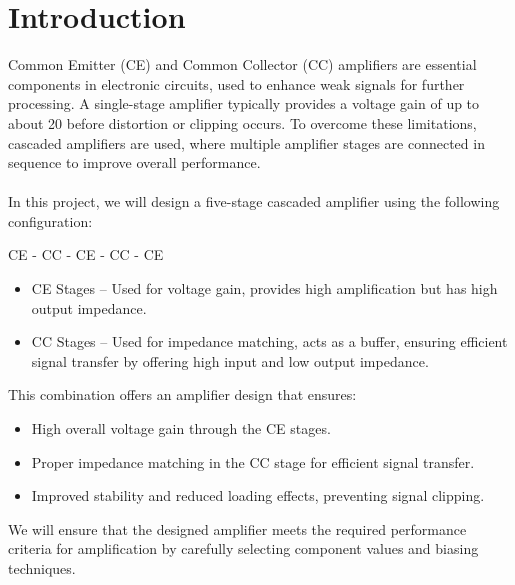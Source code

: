 \documentclass[12pt, a4paper]{article}
\begin{document}
    \section{Introduction}
    Common Emitter (CE) and Common Collector (CC) amplifiers are essential components in electronic circuits, used to enhance weak signals for further processing. 
    A single-stage amplifier typically provides a voltage gain of up to about 20 before distortion or clipping occurs.
    To overcome these limitations, cascaded amplifiers are used, where multiple amplifier stages are connected in sequence to improve overall performance.
    \\
    \\In this project, we will design a five-stage cascaded amplifier using the following \\configuration:
    \begin{center}
        CE - CC - CE - CC - CE 
    \end{center}
\begin{itemize}
\item CE Stages – Used for voltage gain, provides high amplification but has high output impedance.
\item CC Stages – Used for impedance matching, acts as a buffer, ensuring efficient signal transfer by offering high input and low output impedance.
\end{itemize}
This combination offers an amplifier design that ensures:
\begin{itemize}
\item High overall voltage gain through the CE stages.
\item Proper impedance matching in the CC stage for efficient signal transfer.
\item Improved stability and reduced loading effects, preventing signal clipping.
\end{itemize}
We will ensure that the designed amplifier meets the required performance criteria for amplification by carefully selecting component values and biasing techniques.
\end{document}
